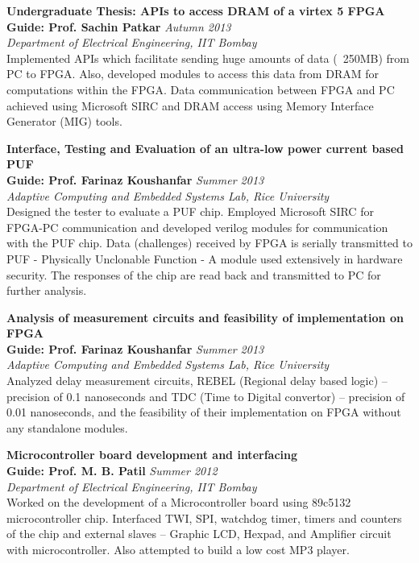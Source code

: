 \documentclass[margin,line]{resume}
\begin{document}
\begin{resume}
	{\bf  Undergraduate Thesis: APIs to access DRAM of a virtex 5 FPGA} \\
	{\bf Guide: Prof. Sachin Patkar} 	\hfill \textit{Autumn 2013} \\
	{\it Department of Electrical Engineering, IIT Bombay}\\
	Implemented APIs which facilitate sending huge amounts of data (~250MB) from PC to FPGA. Also, developed  modules to access this data from DRAM for computations within the FPGA. Data communication between FPGA and PC achieved using Microsoft SIRC and DRAM access using Memory Interface Generator (MIG) tools.
	
    {\bf Interface, Testing and Evaluation of an ultra-low power current based PUF} \\
    {\bf Guide: Prof. Farinaz Koushanfar} \hfill \textit{Summer 2013} \\
    {\it Adaptive Computing and Embedded Systems Lab, Rice University} \\
	Designed the tester to evaluate a PUF chip. Employed Microsoft SIRC for FPGA-PC communication and developed verilog modules for communication with the PUF chip. Data (challenges) received by FPGA is serially transmitted to PUF - Physically Unclonable Function - A module used extensively in hardware security. The responses of the chip are read back and transmitted to PC for further analysis.
	
    {\bf Analysis of measurement circuits and feasibility of implementation on FPGA} \\
    {\bf Guide: Prof. Farinaz Koushanfar} \hfill \textit{Summer 2013} \\
    {\it Adaptive Computing and Embedded Systems Lab, Rice University} \\
    Analyzed delay measurement circuits, REBEL (Regional delay based  logic) – precision of 0.1 nanoseconds and TDC (Time to Digital convertor) – precision of 0.01 nanoseconds, and the feasibility of their implementation on FPGA without any standalone modules.
	
    {\bf Microcontroller board development and interfacing} \\
    {\bf Guide: Prof. M. B. Patil} 	\hfill \textit{Summer 2012} \\
    {\it Department of Electrical Engineering, IIT Bombay}\\
	Worked on the development of a Microcontroller board using 89c5132 microcontroller chip. Interfaced TWI, SPI, watchdog timer, timers and counters of the chip and external slaves – Graphic LCD, Hexpad, and Amplifier circuit with microcontroller. Also attempted to build a low cost MP3 player.
	

\end{resume}
\end{document}
